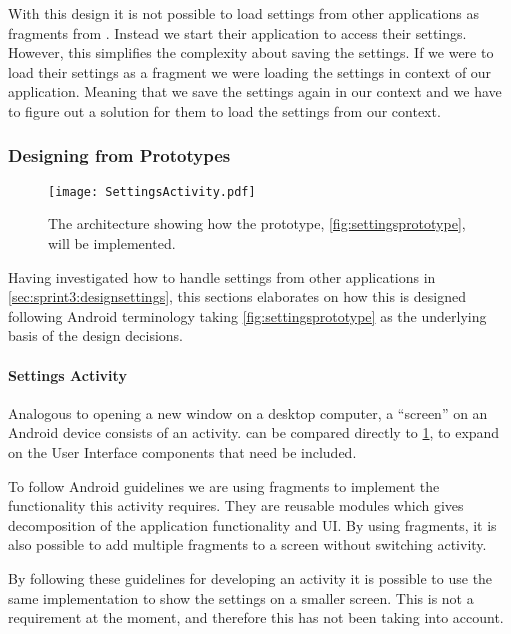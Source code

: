 With this design it is not possible to load settings from other applications as fragments from \launcher. Instead we start their application to access their settings.
However, this simplifies the complexity about saving the settings.
If we were to load their settings as a fragment we were loading the settings in context of our application. 
Meaning that we save the settings again in our context and we have to figure out a solution for them to load the settings from our context.

\subsubsection{Designing from Prototypes}

\begin{figure}[h]
\centering
\texttt{[image: SettingsActivity.pdf]}
\caption{The architecture showing how the prototype, \cref{fig:settingsprototype}, will be implemented.}
\label{fig:settingsarchitecture}
\end{figure}

Having investigated how to handle settings from other \giraf applications in \cref{sec:sprint3:designsettings}, this sections elaborates on how this is designed following Android terminology taking \cref{fig:settingsprototype} as the underlying basis of the design decisions.

\paragraph{Settings Activity}
Analogous to opening a new window on a desktop computer, a ``screen'' on an Android device consists of an activity.
 can be compared directly to \cref{fig:settingsarchitecture}, to expand on the User Interface components that need be included.

To follow Android guidelines we are using fragments\cite{fragments} to implement the functionality this activity requires. They are reusable modules which gives decomposition of the application functionality and UI.
By using fragments, it is also possible to add multiple fragments to a screen without switching activity.

By following these guidelines for developing an activity it is possible to use the same implementation to show the settings on a smaller screen.
This is not a requirement at the moment, and therefore this has not been taking into account.\\

